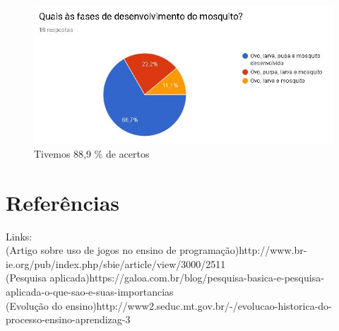 \documentclass[12pt]{article}
\begin{document}
	\begin{figure}[H]
		\centering
		\caption{Tivemos 88,9 \% de acertos}
		\includegraphics[width=0.7\linewidth]{Figuras/Pergunta_5}
		
		\label{fig:pergunta5}
	\end{figure}
	
	\section{Referências} 
	
	Links:\\ 	(Artigo sobre uso de jogos no ensino de programação)http://www.br-ie.org/pub/index.php/sbie/article/view/3000/2511\\
			(Pesquisa aplicada)https://galoa.com.br/blog/pesquisa-basica-e-pesquisa-aplicada-o-que-sao-e-suas-importancias\\
			(Evolução do ensino)http://www2.seduc.mt.gov.br/-/evolucao-historica-do-processo-ensino-aprendizag-3
	
	
	
\end{document}
